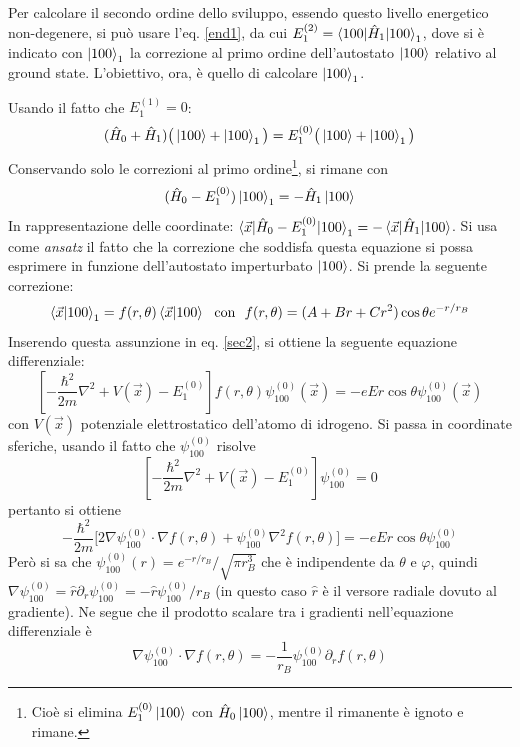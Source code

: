 \documentclass[11pt, a4paper]{scrartcl} %
\numberwithin{equation}{subsection}
\theoremstyle{style2}
\theoremstyle{style1}
\begin{document}
Per calcolare il secondo ordine dello sviluppo, essendo questo livello energetico non-degenere, si pu\`o usare l'eq. \ref{end1}, da cui $E_1^{(2)} = \braket{100|\hat{H}_1|100} _1$, dove si \`e indicato con $\ket{100} _1$ la correzione al primo ordine dell'autostato $\ket{100} $ relativo al ground state.
L'obiettivo, ora, \`e quello di calcolare $\ket{100} _1$.

Usando il fatto che $E_1^{(1)} =   0$:
\[
	(\hat{H}_0 + \hat{H}_1) \big(\ket{100} + \ket{100} _1\big) = E_1^{(0)} \big(\ket{100} + \ket{100} _1\big)
\] 
Conservando solo le correzioni al primo ordine\footnote{Cio\`e si elimina $E_1^{(0)} \ket{100} $ con $\hat{H}_0 \ket{100} $, mentre il rimanente \`e ignoto e rimane.}, si rimane con
\begin{equation}\label{sec2}
(\hat{H}_0 - E_1^{(0)} ) \ket{100} _1 = - \hat{H}_1 \ket{100} 
\end{equation}
In rappresentazione delle coordinate: $\braket{\vec{x}|\hat{H}_0 - E^{(0)} _1 |100} _1=-\braket{\vec{x}|\hat{H}_1|100} $.
Si usa come \textit{ansatz} il fatto che la correzione che soddisfa questa equazione si possa esprimere in funzione dell'autostato imperturbato $\ket{100} $.
Si prende la seguente correzione:
\[
\braket{\vec{x}|100} _1 = f(r,\theta ) \braket{\vec{x}|100} \ \text{ con } \ f(r,\theta ) = (A+Br+Cr^2) \cos \theta  e^{- r / r_B} 
\] 
Inserendo questa assunzione in eq. \ref{sec2}, si ottiene la seguente equazione differenziale:
\begin{equation}
	\left[ - \frac{\hbar ^2}{2m}\nabla ^2 + V(\vec{x}) - E^{(0)} _1 \right] f(r,\theta ) \psi ^{(0)} _{100} (\vec{x}) = -e Er\cos\theta \psi ^{(0)} _{100} (\vec{x})
\end{equation}
con $V(\vec{x})$ potenziale elettrostatico dell'atomo di idrogeno. 
Si passa in coordinate sferiche, usando il fatto che $\psi ^{(0)} _{100} $ risolve
\[
\left[ - \frac{\hbar ^2}{2m}\nabla ^2 + V(\vec{x}) - E_1^{(0)}  \right] \psi ^{(0)} _{100} = 0 
\] 
pertanto si ottiene
\[
	-\frac{\hbar ^2}{2m} \Big[2 \nabla \psi ^{(0)} _{100} \cdot \nabla f(r,\theta ) + \psi _{100} ^{(0)} \nabla ^2 f(r,\theta )\Big] = -e Er\cos \theta  \psi _{100} ^{(0)} 
\] 
Per\`o si sa che $\psi _{100} ^{(0)} (r) = e^{-r / r_B} / \sqrt{\pi r^3 _B} $ che \`e indipendente da $\theta $ e $\varphi $, quindi $\nabla \psi _{100} ^{(0)}  = \hat{r} \partial _r \psi ^{(0)} _{100}  = -\hat{r} \psi ^{(0)} _{100} / r_B$ (in questo caso $\hat{r}$ \`e il versore radiale dovuto al gradiente).
Ne segue che il prodotto scalare tra i gradienti nell'equazione differenziale \`e
\[
\nabla \psi ^{(0)} _{100} \cdot \nabla f(r,\theta ) = - \frac{1}{r_B}\psi _{100} ^{(0)} \partial _r f(r,\theta )
\] 
\end{document}
